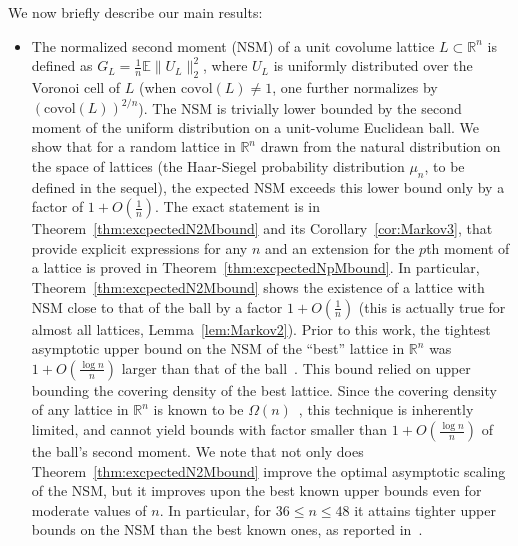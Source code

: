 \documentclass[article,doublecolumn]{IEEEtran}
\newcommand{\EE}{{\mathbb{E}}}
\newcommand{\R}{{\mathbb{R}}}
\begin{document}
\medskip

We now briefly describe our main results:
\begin{itemize}
\item The normalized second moment (NSM) of a unit covolume lattice $L\subset \R^n$ is defined as $G_L=\frac{1}{n}\EE\|U_L\|_2^2$, where $U_L$ is uniformly distributed over the Voronoi cell of $L$ (when $\mathrm{covol}(L)\neq 1$, one further normalizes by $(\mathrm{covol}(L))^{2/n}$).
The NSM is trivially lower bounded by the second moment of the uniform distribution on a unit-volume Euclidean ball. We show that for a random lattice in $\R^n$ drawn from the natural distribution on the space of lattices (the Haar-Siegel probability distribution $\mu_n$, to be defined in the sequel), the expected NSM exceeds this lower bound only by a factor of $1+O(\frac{1}{n})$. The exact statement is in Theorem~\ref{thm:excpectedN2Mbound} and its Corollary~\ref{cor:Markov3}, that provide explicit expressions for any $n$ and an extension for the $p$th moment of a lattice is proved in Theorem~\ref{thm:excpectedNpMbound}. In particular, Theorem~\ref{thm:excpectedN2Mbound} shows the existence of a lattice with NSM close to that of the ball by a factor $1+O(\frac{1}{n})$ (this is actually true for almost all lattices, Lemma~\ref{lem:Markov2}).
Prior to this work, the tightest asymptotic upper bound on the NSM of the ``best'' lattice in $\R^n$  was $1+O(\frac{\log n}{n})$ larger than that of the ball~\cite{ZamirFeder2002}. This bound relied on upper bounding the covering density of the best lattice. Since the covering density of any lattice in $\R^n$ is known to be $\Omega(n)$~\cite{CoxeterFewRogers}, this technique is inherently limited, and cannot yield bounds with factor smaller than $1+O(\frac{\log n}{n})$ of the ball's second moment. We note that not only does Theorem~\ref{thm:excpectedN2Mbound} improve the optimal asymptotic scaling of the NSM, but it improves upon the best known upper bounds even for moderate values of $n$. In particular, for $36\leq n\leq 48$ it attains tighter upper bounds on the NSM than the best known ones, as reported in~\cite{agrell2023best}.


\end{itemize}
\end{document}
